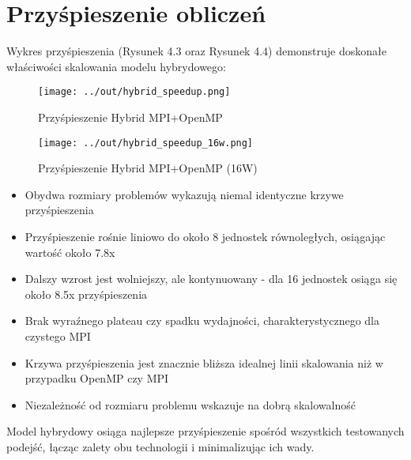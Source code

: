 \documentclass[12pt,a4paper]{report}
\begin{document}
\section{Przyśpieszenie obliczeń}
Wykres przyśpieszenia (Rysunek 4.3 oraz Rysunek 4.4) demonstruje doskonałe właściwości skalowania modelu hybrydowego:
\begin{figure}[h]
    \centering
    \texttt{[image: ../out/hybrid\_speedup.png]}
    \caption{Przyśpieszenie Hybrid MPI+OpenMP}
    \label{fig:hybrid_speedup}
\end{figure}
\begin{figure}[h]
    \centering
    \texttt{[image: ../out/hybrid\_speedup\_16w.png]}
    \caption{Przyśpieszenie Hybrid MPI+OpenMP (16W)}
    \label{fig:hybrid_speedup_16w}
\end{figure}
\begin{itemize}
    \item Obydwa rozmiary problemów wykazują niemal identyczne krzywe przyśpieszenia
    \item Przyśpieszenie rośnie liniowo do około 8 jednostek równoległych, osiągając wartość około 7.8x
    \item Dalszy wzrost jest wolniejszy, ale kontynuowany - dla 16 jednostek osiąga się około 8.5x przyśpieszenia
    \item Brak wyraźnego plateau czy spadku wydajności, charakterystycznego dla czystego MPI
    \item Krzywa przyśpieszenia jest znacznie bliższa idealnej linii skalowania niż w przypadku OpenMP czy MPI
    \item Niezależność od rozmiaru problemu wskazuje na dobrą skalowalność
\end{itemize}

Model hybrydowy osiąga najlepsze przyśpieszenie spośród wszystkich testowanych podejść, łącząc zalety obu technologii i minimalizując ich wady.
\end{document}
